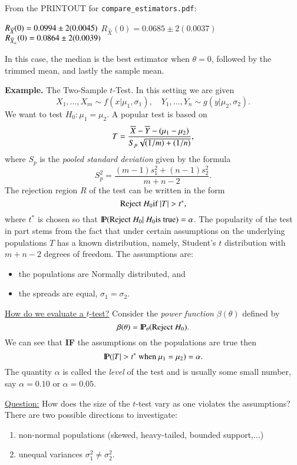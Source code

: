 \documentclass[captions=tableheading]{scrbook}
\begin{document}
From the PRINTOUT for \texttt{compare\_estimators.pdf}:

$R_{\Xbar}(0)=0.0994\pm2(0.0045)$
$R_{\overset{\sim}{X}}(0)=0.0685\pm2(0.0037)$
$R_{\Xbar_{\alpha}}(0)=0.0864\pm2(0.0039)$

In this case, the median is the best estimator when $\theta=0$, followed by the trimmed mean, and lastly the sample mean.  

\textbf{Example.} The Two-Sample $t$-Test.
In this setting we are given 
\[
X_{1},\ldots,X_{m}\sim f(x|\mu_{1},\sigma_{1}),\quad Y_{1},\ldots,Y_{n}\sim g(y|\mu_{2},\sigma_{2}).
\]
We want to test $H_{0}:\mu_{1}=\mu_{2}$. A popular test is based on 
\[
T=\frac{\Xbar-\overline{Y}-(\mu_{1}-\mu_{2})}{S_{p}\sqrt{(1/m)+(1/n)}},
\]
where $S_{p}$ is the \emph{pooled standard deviation} given by the
formula 
\[
S_{p}^{2}=\frac{(m-1)s_{1}^{2}+(n-1)s_{2}^{2}}{m+n-2}.
\]
 The rejection region $R$ of the test can be written in the form
\[
\mbox{Reject \ensuremath{H_{0}}if \ensuremath{|T|>t^{\ast}}},
\]
where $t^{\ast}$ is chosen so that $\P(\mbox{Reject \ensuremath{H_{0}}}|\mbox{ \ensuremath{H_{0}}is true})=\alpha$. The popularity of the test in part stems from the fact that under certain assumptions on the underlying populations $T$ has a known distribution, namely, Student's $t$ distribution with $m+n-2$ degrees of freedom. The assumptions are:

\begin{itemize}
\item the populations are Normally distributed, and
\item the spreads are equal, $\sigma_{1}=\sigma_{2}$.
\end{itemize}

\underline{How do we evaluate a $t$-test?} Consider the \emph{power function} $\beta(\theta)$ defined by 
\[
\beta(\theta)=\P_{\theta}(\mbox{Reject \ensuremath{H_{0}}}).
\]
 We can see that \textbf{IF} the assumptions on the populations are true then 
\[
\P(|T|>t^{\ast}\mbox{ when \ensuremath{\mu_{1}=\mu_{2}}})=\alpha.
\]
The quantity $\alpha$ is called the \emph{level} of the test and is usually some small number, say $\alpha=0.10$ or $\alpha=0.05$.

\underline{Question:} How does the size of the $t$-test vary as one violates the assumptions? There are two possible directions to investigate:


\begin{enumerate}
\item non-normal populations (skewed, heavy-tailed, bounded support,$\ldots$)
\item unequal variances $\sigma_{1}^{2}\neq\sigma_{2}^{2}$.
\end{enumerate}
\end{document}

